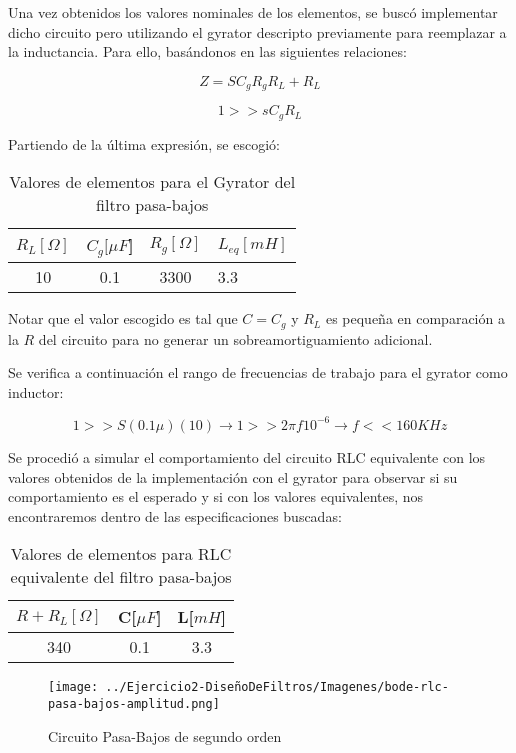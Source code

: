 Una vez obtenidos los valores nominales de los elementos, se buscó implementar dicho circuito pero utilizando el gyrator descripto previamente
para reemplazar a la inductancia. Para ello, basándonos 
en las siguientes relaciones:

$$Z=SC_gR_gR_L+R_L$$

$$1 >> sC_gR_L$$

Partiendo de la última expresión, se escogió:

\begin{table}[H]
    \centering
    \begin{tabular}{|c|c|c|l|}
    \hline
    \rowcolor[HTML]{C0C0C0} 
    $R_L[\Omega]$ & $C_g[\mu F$] & $R_g[\Omega]$  & $L_{eq}[mH]$ \\ \hline
     10       & 0.1  & 3300 & 3.3        \\ \hline
    \end{tabular}
    \caption{Valores de elementos para el Gyrator del filtro pasa-bajos}
    \end{table}


Notar que el valor escogido es tal que $C=C_g$ y $R_L$ es pequeña en comparación a la $R$ del circuito para no generar
un sobreamortiguamiento adicional.

Se verifica a continuación el rango de frecuencias de trabajo para el gyrator como inductor:

$$1 >> S(0.1 \mu )(10) \longrightarrow 1  >> 2 \pi f 10^{-6} \longrightarrow f << 160 KHz$$

Se procedió a simular el comportamiento del circuito RLC equivalente con los valores obtenidos de la implementación con el 
gyrator para observar si su comportamiento es el esperado y si con los valores equivalentes, nos encontraremos dentro de las especificaciones
buscadas:

\begin{table}[H]
    \centering
    \begin{tabular}{|c|c|c|}
    \hline
    \rowcolor[HTML]{C0C0C0} 
    $R+R_L[\Omega]$ & C[$\mu F$] & L[$mH$]  \\ \hline
    340      & 0.1  & 3.3 \\ \hline
    \end{tabular}
    \caption{Valores de elementos para RLC equivalente del filtro pasa-bajos}
    \end{table}

\begin{figure}[H]
    \centering
    \texttt{[image: ../Ejercicio2-DiseñoDeFiltros/Imagenes/bode-rlc-pasa-bajos-amplitud.png]}
    \caption{Circuito Pasa-Bajos de segundo orden}
\end{figure}


